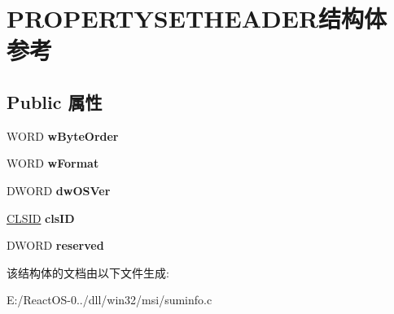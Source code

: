 \hypertarget{struct_p_r_o_p_e_r_t_y_s_e_t_h_e_a_d_e_r}{}\section{P\+R\+O\+P\+E\+R\+T\+Y\+S\+E\+T\+H\+E\+A\+D\+E\+R结构体 参考}
\label{struct_p_r_o_p_e_r_t_y_s_e_t_h_e_a_d_e_r}
\subsection*{Public 属性}
\begin{DoxyCompactItemize}
\item 
\mbox{\label{struct_p_r_o_p_e_r_t_y_s_e_t_h_e_a_d_e_r_a499ceaaf7b14bd433b96405e744e3872}} 
W\+O\+RD {\bfseries w\+Byte\+Order}
\item 
\mbox{\label{struct_p_r_o_p_e_r_t_y_s_e_t_h_e_a_d_e_r_ad932b6e40f22a02e8488023cbeab009e}} 
W\+O\+RD {\bfseries w\+Format}
\item 
\mbox{\label{struct_p_r_o_p_e_r_t_y_s_e_t_h_e_a_d_e_r_a3e50e41b5e3523333c9c4be7191396fb}} 
D\+W\+O\+RD {\bfseries dw\+O\+S\+Ver}
\item 
\mbox{\label{struct_p_r_o_p_e_r_t_y_s_e_t_h_e_a_d_e_r_adf792c2ad517609d71ec2e0844057956}} 
\hyperlink{struct___i_i_d}{C\+L\+S\+ID} {\bfseries cls\+ID}
\item 
\mbox{\label{struct_p_r_o_p_e_r_t_y_s_e_t_h_e_a_d_e_r_a6010aa80da13bd5ba74f8c58a07b2b97}} 
D\+W\+O\+RD {\bfseries reserved}
\end{DoxyCompactItemize}


该结构体的文档由以下文件生成\+:\begin{DoxyCompactItemize}
\item 
E\+:/\+React\+O\+S-\/0../dll/win32/msi/suminfo.\+c\end{DoxyCompactItemize}
